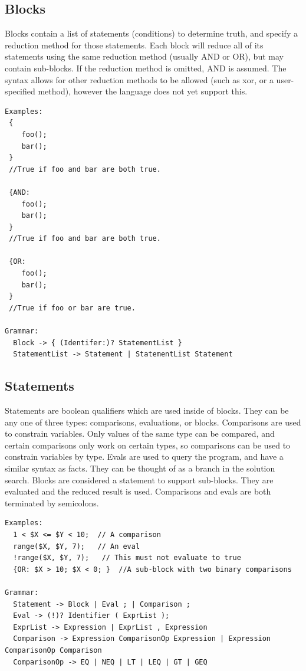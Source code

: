 \documentclass[onecolumn,titlepage]{article}
\begin{document}
\subsection{Blocks}
Blocks contain a list of statements (conditions) to determine truth, and specify a reduction 
method for those statements.  Each block will reduce all of its statements using the same
reduction method (usually AND or OR), but may contain sub-blocks.  If the reduction method
is omitted, AND is assumed.  The syntax allows for other reduction methods to be allowed
(such as xor, or a user-specified method), however the language does not yet support this.
\begin{verbatim}
Examples:
 { 
    foo();
    bar();
 }
 //True if foo and bar are both true.

 {AND:
    foo();
    bar();
 }
 //True if foo and bar are both true.

 {OR:
    foo();
    bar();
 }
 //True if foo or bar are true.

Grammar:
  Block -> { (Identifer:)? StatementList }
  StatementList -> Statement | StatementList Statement
\end{verbatim}

\subsection{Statements}
Statements are boolean qualifiers which are used inside of blocks.
They can be any one of three types: comparisons, evaluations, or
blocks. Comparisons are used to constrain variables.  Only values of
the same type can be compared, and certain comparisons only work on
certain types, so comparisons can be used to constrain variables by
type.  Evals are used to query the program, and have a similar syntax
as facts.  They can be thought of as a branch in the solution search.
Blocks are considered a statement to support sub-blocks.  They are
evaluated and the reduced result is used.  Comparisons and evals are
both terminated by semicolons.

\begin{verbatim}
Examples:
  1 < $X <= $Y < 10;  // A comparison
  range($X, $Y, 7);   // An eval
  !range($X, $Y, 7);   // This must not evaluate to true
  {OR: $X > 10; $X < 0; }  //A sub-block with two binary comparisons

Grammar:
  Statement -> Block | Eval ; | Comparison ;
  Eval -> (!)? Identifier ( ExprList );
  ExprList -> Expression | ExprList , Expression
  Comparison -> Expression ComparisonOp Expression | Expression ComparisonOp Comparison
  ComparisonOp -> EQ | NEQ | LT | LEQ | GT | GEQ
\end{verbatim}
\end{document}
